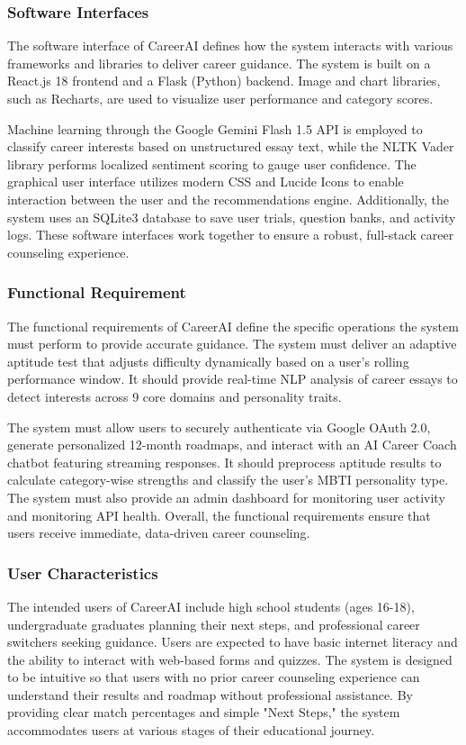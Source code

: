 \subsubsection{{Software Interfaces}}
{}{The software interface of CareerAI defines how the system interacts with various frameworks and libraries to deliver career guidance. The system is built on a React.js 18 frontend and a Flask (Python) backend. Image and chart libraries, such as Recharts, are used to visualize user performance and category scores.

Machine learning through the Google Gemini Flash 1.5 API is employed to classify career interests based on unstructured essay text, while the NLTK Vader library performs localized sentiment scoring to gauge user confidence. The graphical user interface utilizes modern CSS and Lucide Icons to enable interaction between the user and the recommendations engine. Additionally, the system uses an SQLite3 database to save user trials, question banks, and activity logs. These software interfaces work together to ensure a robust, full-stack career counseling experience.}

\subsubsection{{Functional Requirement}}
{}{The functional requirements of CareerAI define the specific operations the system must perform to provide accurate guidance. The system must deliver an adaptive aptitude test that adjusts difficulty dynamically based on a user's rolling performance window. It should provide real-time NLP analysis of career essays to detect interests across 9 core domains and personality traits.

The system must allow users to securely authenticate via Google OAuth 2.0, generate personalized 12-month roadmaps, and interact with an AI Career Coach chatbot featuring streaming responses. It should preprocess aptitude results to calculate category-wise strengths and classify the user's MBTI personality type. The system must also provide an admin dashboard for monitoring user activity and monitoring API health. Overall, the functional requirements ensure that users receive immediate, data-driven career counseling.}

\subsubsection{{User Characteristics}}
{}{The intended users of CareerAI include high school students (ages 16-18), undergraduate graduates planning their next steps, and professional career switchers seeking guidance. Users are expected to have basic internet literacy and the ability to interact with web-based forms and quizzes. The system is designed to be intuitive so that users with no prior career counseling experience can understand their results and roadmap without professional assistance. By providing clear match percentages and simple "Next Steps," the system accommodates users at various stages of their educational journey.}

